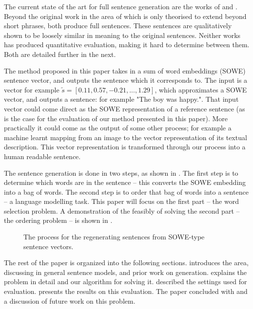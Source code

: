 \documentclass[11pt]{article}
\theoremstyle{plain}
\theoremstyle{definition}
\begin{document}
The current state of the art for full sentence generation are the works of \cite{iyyer2014generating} and \cite{Bowman2015SmoothGeneration}. Beyond the original work in the area of \cite{Dinu2014CompositionalGeneration} which is only theorised to extend beyond short phrases, both produce full sentences. These sentences are qualitatively shown to be loosely similar in meaning to the original sentences. Neither works has produced quantitative evaluation, making it hard to determine between them. Both are detailed further in the next.


The method proposed in this paper takes in a sum of word embeddings (SOWE) sentence vector, and outputs the sentence which it corresponds to. The input is a vector for example $\tilde{s}=[0.11, 0.57,-0.21,...,1.29]$, which approximates a SOWE vector, and outputs a sentence: for example "The boy was happy.". That input vector could come direct as the SOWE representation of a reference sentence (as is the case for the evaluation of our method presented in this paper). More practically it could come as the output of some other process; for example a machine learnt mapping from an image to the vector representation of its textual description. This vector representation is transformed through our process into a human readable sentence.

The sentence generation is done in two steps, as shown in . The first step is to determine which words are in the sentence -- this converts the SOWE embedding into a bag of words. The second step is to order that bag of words into a sentence -- a language modelling task. This paper will focus on the first part -- the word selection problem. A demonstration of the feasibly of solving the second part -- the ordering problem --  is shown in .

\begin{figure}
	\centering 
	
	\caption{The process for the regenerating sentences from SOWE-type sentence vectors. }
	\label{block_diagram}
\end{figure}

The rest of the paper is organized into the following sections.  introduces the area, discussing in general sentence models, and prior work on generation.  explains the problem in detail and our algorithm for solving it.  described the settings used for evaluation.  presents the results on this evaluation. The paper concluded with  and a discussion of future work on this problem.
\end{document}
